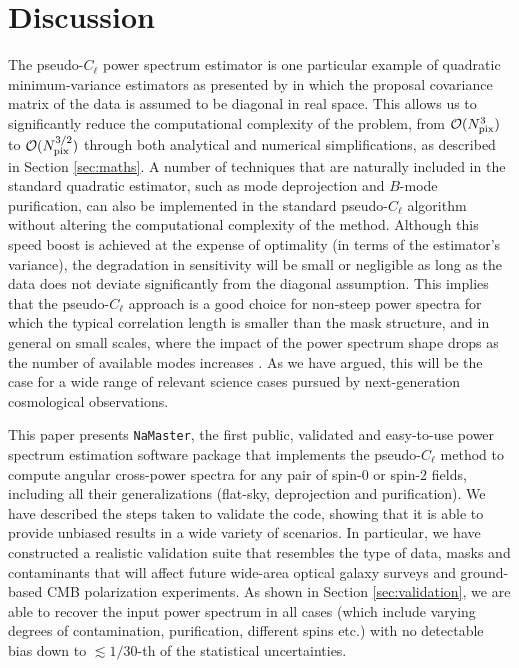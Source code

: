 \documentclass[usenatbib]{mnrasb}
\newcommand{\nmt}{{\tt NaMaster}}
\begin{document}
  \section{Discussion}\label{sec:discussion}
    The pseudo-$C_\ell$ power spectrum estimator is one particular example of quadratic minimum-variance estimators as presented by \cite{1997PhRvD..55.5895T} in which the proposal covariance matrix of the data is assumed to be diagonal in real space. This allows us to significantly reduce the computational complexity of the problem, from ${\cal O}(N_{\rm pix}^3)$ to ${\cal O}(N_{\rm pix}^{3/2})$ through both analytical and numerical simplifications, as described in Section \ref{sec:maths}. A number of techniques that are naturally included in the standard quadratic estimator, such as mode deprojection and $B$-mode purification, can also be implemented in the standard pseudo-$C_\ell$ algorithm without altering the computational complexity of the method. Although this speed boost is achieved at the expense of optimality (in terms of the estimator's variance), the degradation in sensitivity will be small or negligible as long as the data does not deviate significantly from the diagonal assumption. This implies that the pseudo-$C_\ell$ approach is a good choice for non-steep power spectra for which the typical correlation length is smaller than the mask structure, and in general on small scales, where the impact of the power spectrum shape drops as the number of available modes increases \citep{2004MNRAS.349..603E,2006MNRAS.370..343E}. As we have argued, this will be the case for a wide range of relevant science cases pursued by next-generation cosmological observations.
    
    This paper presents \nmt, the first public, validated and easy-to-use power spectrum estimation software package that implements the pseudo-$C_\ell$ method to compute angular cross-power spectra for any pair of spin-0 or spin-2 fields, including all their generalizations (flat-sky, deprojection and purification). We have described the steps taken to validate the code, showing that it is able to provide unbiased results in a wide variety of scenarios. In particular, we have constructed a realistic validation suite that resembles the type of data, masks and contaminants that will affect future wide-area optical galaxy surveys and ground-based CMB polarization experiments. As shown in Section \ref{sec:validation}, we are able to recover the input power spectrum in all cases (which include varying degrees of contamination, purification, different spins etc.) with no detectable bias down to $\lesssim1/30$-th of the statistical uncertainties.
    
\end{document}
